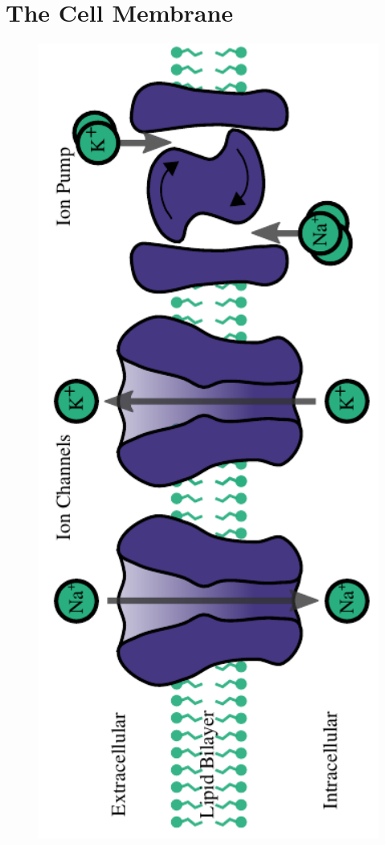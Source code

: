 \documentclass[altfont, fleqn]{uiophd}
\begin{document}
\section{The Cell Membrane}
\begin{figure}[h]
    \centering
    \includegraphics[angle=-90,width=1.0\textwidth]{images/sec_2/ion_pumps_0.pdf}

\end{figure}
\end{document}
